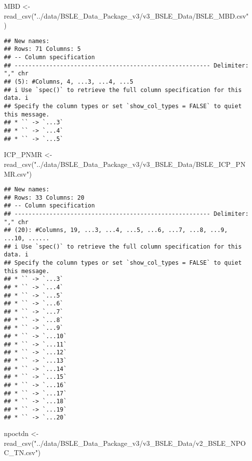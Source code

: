 \documentclass[
]{article}
\newenvironment{Shaded}{\begin{snugshade}}{\end{snugshade}}
\newcommand{\FunctionTok}[1]{\textcolor[rgb]{0.00,0.00,0.00}{#1}}
\newcommand{\NormalTok}[1]{#1}
\newcommand{\OtherTok}[1]{\textcolor[rgb]{0.56,0.35,0.01}{#1}}
\newcommand{\StringTok}[1]{\textcolor[rgb]{0.31,0.60,0.02}{#1}}
\begin{document}
\begin{Shaded}
\begin{Highlighting}[]
\NormalTok{MBD }\OtherTok{\textless{}{-}} \FunctionTok{read\_csv}\NormalTok{(}\StringTok{"../data/BSLE\_Data\_Package\_v3/v3\_BSLE\_Data/BSLE\_MBD.csv"}\NormalTok{)}
\end{Highlighting}
\end{Shaded}

\begin{verbatim}
## New names:
## Rows: 71 Columns: 5
## -- Column specification
## -------------------------------------------------------- Delimiter: "," chr
## (5): #Columns, 4, ...3, ...4, ...5
## i Use `spec()` to retrieve the full column specification for this data. i
## Specify the column types or set `show_col_types = FALSE` to quiet this message.
## * `` -> `...3`
## * `` -> `...4`
## * `` -> `...5`
\end{verbatim}

\begin{Shaded}
\begin{Highlighting}[]
\NormalTok{ICP\_PNMR }\OtherTok{\textless{}{-}} \FunctionTok{read\_csv}\NormalTok{(}\StringTok{"../data/BSLE\_Data\_Package\_v3/v3\_BSLE\_Data/BSLE\_ICP\_PNMR.csv"}\NormalTok{)}
\end{Highlighting}
\end{Shaded}

\begin{verbatim}
## New names:
## Rows: 33 Columns: 20
## -- Column specification
## -------------------------------------------------------- Delimiter: "," chr
## (20): #Columns, 19, ...3, ...4, ...5, ...6, ...7, ...8, ...9, ...10, ......
## i Use `spec()` to retrieve the full column specification for this data. i
## Specify the column types or set `show_col_types = FALSE` to quiet this message.
## * `` -> `...3`
## * `` -> `...4`
## * `` -> `...5`
## * `` -> `...6`
## * `` -> `...7`
## * `` -> `...8`
## * `` -> `...9`
## * `` -> `...10`
## * `` -> `...11`
## * `` -> `...12`
## * `` -> `...13`
## * `` -> `...14`
## * `` -> `...15`
## * `` -> `...16`
## * `` -> `...17`
## * `` -> `...18`
## * `` -> `...19`
## * `` -> `...20`
\end{verbatim}

\begin{Shaded}
\begin{Highlighting}[]
\NormalTok{npoctdn }\OtherTok{\textless{}{-}} \FunctionTok{read\_csv}\NormalTok{(}\StringTok{"../data/BSLE\_Data\_Package\_v3/v3\_BSLE\_Data/v2\_BSLE\_NPOC\_TN.csv"}\NormalTok{)}
\end{Highlighting}
\end{Shaded}
\end{document}
